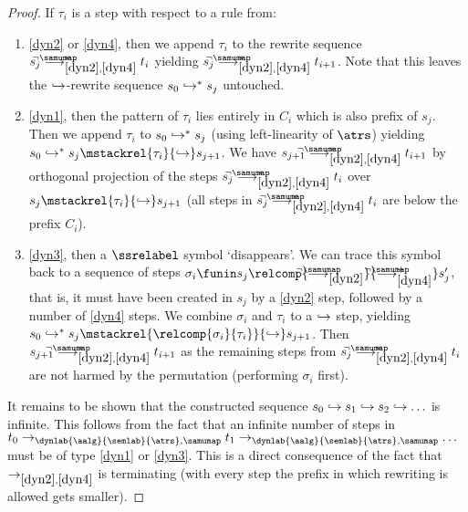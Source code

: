 \begin{proof}
  If $\tau_i$ is a step with respect to a rule from:
  \begin{enumerate}[$-$]

  \item
\eqref{dyn2} or \eqref{dyn4}, then
  we append $\tau_i$ to the rewrite sequence 
  $s_j \nto_{\ref{dyn2},\ref{dyn4}}^* t_i$
  yielding 
  $s_j \nto_{\ref{dyn2},\ref{dyn4}}^* t_{i+1}$.
  Note that this leaves the $\hookrightarrow$-rewrite sequence $s_0 \hookrightarrow^{\ast} s_j$ untouched.

  \item
\eqref{dyn1},
  then the pattern of $\tau_i$ lies entirely in $C_i$ which is also prefix of $s_j$.
  Then we append $\tau_i$ to $s_0 \hookrightarrow^{\ast} s_j$ (using left-linearity of $\atrs$) 
  yielding $s_0 \sto^{\ast} s_j \mstackrel{\tau_i}{\sto} s_{j+1}$.
  We have $s_{j+1} \nto_{\ref{dyn2},\ref{dyn4}}^* t_{i+1}$
  by orthogonal projection of the steps $s_j \nto_{\ref{dyn2},\ref{dyn4}}^* t_i$
  over $s_j \mstackrel{\tau_i}{\sto} s_{j+1}$ (all steps in $s_j \nto_{\ref{dyn2},\ref{dyn4}}^* t_i$ are below the prefix $C_i$).
  
  \item
\eqref{dyn3}, then a $\ssrelabel$ symbol `disappears'.
  We can trace this symbol back to a sequence of steps
  $\sigma_i \funin s_j \relcomp{ \nto_{\ref{dyn2}} }{ \nto_{\ref{dyn4}}^+ } s_j'$,
  that is, it must have been created in $s_j$ by a \eqref{dyn2} step,
  followed by a number of \eqref{dyn4} steps.
  We combine $\sigma_i$ and $\tau_i$ to a $\hookrightarrow$ step,
  yielding $s_0 \sto^* s_j \mstackrel{\relcomp{\sigma_i}{\tau_i}}{\sto} s_{j+1}$.
  Then $s_{j+1} \nto_{\ref{dyn2},\ref{dyn4}}^* t_{i+1}$
  as the remaining steps from
  $s_j \nto_{\ref{dyn2},\ref{dyn4}}^* t_i$ are not harmed by the permutation (performing $\sigma_i$ first).

  \end{enumerate}

  \noindent
  It remains to be shown that the constructed sequence $s_0 \hookrightarrow s_1 \hookrightarrow s_2 \hookrightarrow \ldots$ is infinite.
  This follows from the fact that an infinite number of steps in
  $t_0 \to_{\dynlab{\aalg}{\semlab}{\atrs},\samumap} t_1 \to_{\dynlab{\aalg}{\semlab}{\atrs},\samumap} \ldots$
  must be of type \eqref{dyn1} or \eqref{dyn3}.
  This is a direct consequence of the fact that
  $\to_{\ref{dyn2},\ref{dyn4}}$ is terminating
  (with every step the prefix in which rewriting is allowed gets smaller).
\end{proof}

